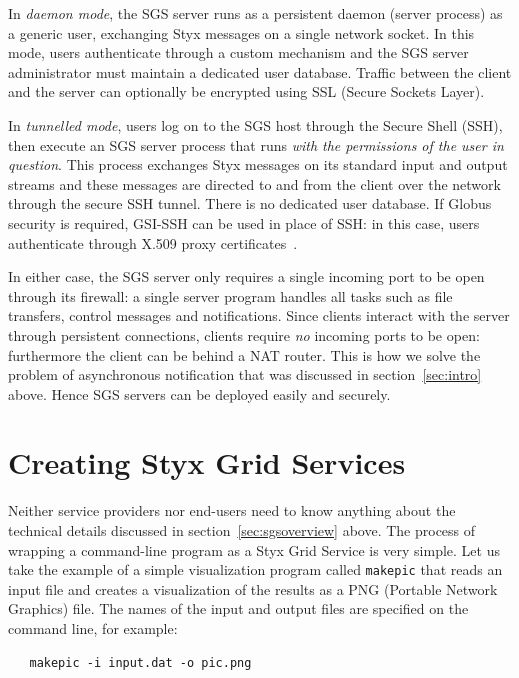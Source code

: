 \documentclass[a4paper]{article}
\begin{document}
In \textit{daemon mode}, the SGS server runs as a persistent daemon (server process) as a generic user, exchanging Styx messages on a single network socket.  In this mode, users authenticate through a custom mechanism and the SGS server administrator must maintain a dedicated user database.  Traffic between the client and the server can optionally be encrypted using SSL (Secure Sockets Layer).

In \textit{tunnelled mode}, users log on to the SGS host through the Secure Shell (SSH), then execute an SGS server process that runs \textit{with the permissions of the user in question}.  This process exchanges Styx messages on its standard input and output streams and these messages are directed to and from the client over the network through the secure SSH tunnel.  There is no dedicated user database.  If Globus security is required, GSI-SSH can be used in place of SSH: in this case, users authenticate through X.509 proxy certificates~\cite{blower_escience:2006}.

In either case, the SGS server only requires a single incoming port to be open through its firewall: a single server program handles all tasks such as file transfers, control messages and notifications.  Since clients interact with the server through persistent connections, clients require \textit{no} incoming ports to be open: furthermore the client can be behind a NAT router.  This is how we solve the problem of asynchronous notification that was discussed in section~\ref{sec:intro} above.  Hence SGS servers can be deployed easily and securely.


\section{Creating Styx Grid Services}\label{sec:wrapping}
Neither service providers nor end-users need to know anything about the technical details discussed in section~\ref{sec:sgsoverview} above.  The process of wrapping a command-line program as a Styx Grid Service is very simple.  Let us take the example of a simple visualization program called \texttt{makepic} that reads an input file and creates a visualization of the results as a PNG (Portable Network Graphics) file.  The names of the input and output files are specified on the command line, for example:

\begin{verbatim}
   makepic -i input.dat -o pic.png
\end{verbatim}
\end{document}
